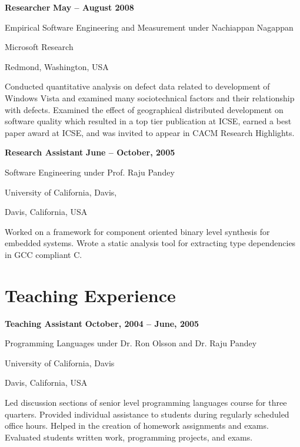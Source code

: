 \documentclass[margin,line,article]{res}
\newenvironment{list1}{
  \begin{list}{}{%
      \setlength{\itemsep}{0in}
      \setlength{\parsep}{0in} \setlength{\parskip}{0in}
      \setlength{\topsep}{0in} \setlength{\partopsep}{0in} 
      \setlength{\leftmargin}{0.17in}}}{\end{list}}
\begin{document}
\begin{resume}
\textbf{Researcher} \hfill \textbf{May -- August 2008}\\
\vspace{-10pt}
\begin{list1}
\item Empirical Software Engineering and Measurement under Nachiappan Nagappan
\item Microsoft Research
\item Redmond, Washington, USA
\vspace{6pt}
\item Conducted quantitative analysis on defect data related to development of Windows 
Vista and examined many sociotechnical factors and their relationship with defects. 
Examined the effect of geographical distributed development on software quality which 
resulted in a top tier publication at ICSE, earned a best paper award at ICSE,
and was invited to appear in CACM Research Highlights.
\end{list1}

\textbf{Research Assistant} \hfill \textbf{June -- October, 2005}\\
\vspace{-10pt}
\begin{list1}
\item Software Engineering under Prof. Raju Pandey
\item University of California, Davis,
\item Davis, California, USA
\vspace{6pt}
\item Worked on a framework for component oriented binary level synthesis for embedded 
systems. Wrote a static analysis tool for extracting type dependencies in GCC compliant 
C. 
\end{list1}

\section{Teaching Experience}
\textbf{Teaching Assistant} \hfill \textbf{October, 2004 -- June, 2005}\\
\vspace{-10pt}
\begin{list1}
\item Programming Languages under Dr. Ron Olsson and Dr. Raju Pandey
\item University of California, Davis
\item Davis, California, USA
\vspace{6pt}
\item Led discussion sections of senior level programming languages course for three quarters.
Provided individual assistance to students during regularly scheduled office hours. 
Helped in the creation of homework assignments and exams. Evaluated students written 
work, programming projects, and exams. 
\end{list1}


\end{resume}
\end{document}
